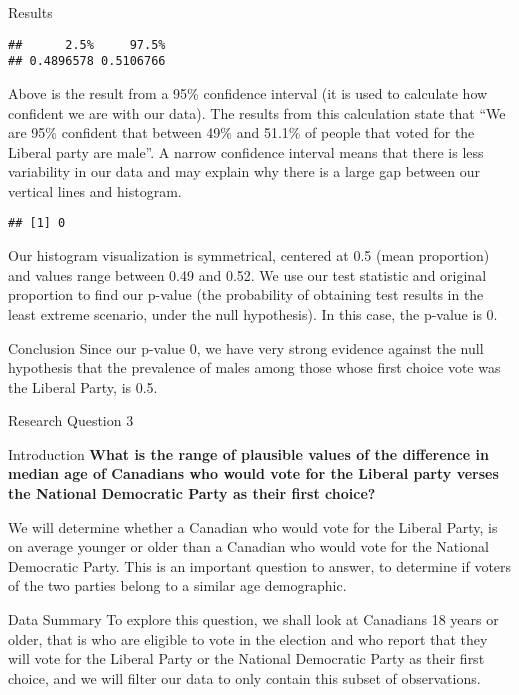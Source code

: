 \documentclass[
  9pt,
  ignorenonframetext,
]{beamer}
\begin{document}
\begin{frame}[fragile]
\begin{block}{Results}
\protect\hypertarget{results-1}{}
\begin{verbatim}
##      2.5%     97.5% 
## 0.4896578 0.5106766
\end{verbatim}

Above is the result from a 95\% confidence interval (it is used to
calculate how confident we are with our data). The results from this
calculation state that ``We are 95\% confident that between 49\% and
51.1\% of people that voted for the Liberal party are male''. A narrow
confidence interval means that there is less variability in our data and
may explain why there is a large gap between our vertical lines and
histogram.

\begin{verbatim}
## [1] 0
\end{verbatim}

Our histogram visualization is symmetrical, centered at 0.5 (mean
proportion) and values range between 0.49 and 0.52. We use our test
statistic and original proportion to find our p-value (the probability
of obtaining test results in the least extreme scenario, under the null
hypothesis). In this case, the p-value is 0.
\end{block}

\begin{block}{Conclusion}
\protect\hypertarget{conclusion-1}{}
Since our p-value 0, we have very strong evidence against the null
hypothesis that the prevalence of males among those whose first choice
vote was the Liberal Party, is 0.5.
\end{block}
\end{frame}

\begin{frame}{Research Question 3}
\protect\hypertarget{research-question-3}{}
\begin{block}{Introduction}
\protect\hypertarget{introduction-3}{}
\textbf{What is the range of plausible values of the difference in
median age of Canadians who would vote for the Liberal party verses the
National Democratic Party as their first choice?}

We will determine whether a Canadian who would vote for the Liberal
Party, is on average younger or older than a Canadian who would vote for
the National Democratic Party. This is an important question to answer,
to determine if voters of the two parties belong to a similar age
demographic.
\end{block}

\begin{block}{Data Summary}
\protect\hypertarget{data-summary-1}{}
To explore this question, we shall look at Canadians 18 years or older,
that is who are eligible to vote in the election and who report that
they will vote for the Liberal Party or the National Democratic Party as
their first choice, and we will filter our data to only contain this
subset of observations.
\end{block}
\end{frame}
\end{document}
